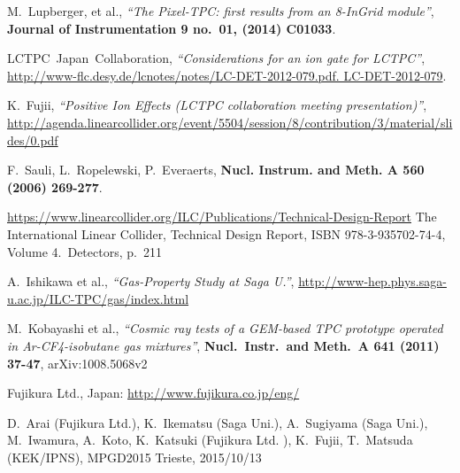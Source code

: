 \begin{thebibliography}{9}
M.~Lupberger, et al., \textit{``The Pixel-TPC: first results from an 8-InGrid module''}, {{\textbf {Journal of Instrumentation {\bfseries 9} no.~01, (2014) {C01033}}}}.








LCTPC~Japan~Collaboration, \textit{``Considerations for an ion gate for LCTPC''},
\url{http://www-flc.desy.de/lcnotes/notes/LC-DET-2012-079.pdf. LC-DET-2012-079}.



K.~Fujii, \textit{``Positive Ion Effects (LCTPC collaboration meeting presentation)''},
\url{http://agenda.linearcollider.org/event/5504/session/8/contribution/3/material/slides/0.pdf}






F.~Sauli, L.~Ropelewski, P.~Everaerts, \textbf{Nucl. Instrum. and Meth. A 560 (2006)  269-277}.



\url{https://www.linearcollider.org/ILC/Publications/Technical-Design-Report}
The International Linear Collider, Technical Design Report, ISBN 978-3-935702-74-4,
Volume 4.~Detectors, p.~211



A.~Ishikawa et al., \textit{``Gas-Property Study at Saga U.''}, \url{http://www-hep.phys.saga-u.ac.jp/ILC-TPC/gas/index.html}



M.~Kobayashi et al., \textit{``Cosmic ray tests of a GEM-based TPC prototype operated in Ar-CF4-isobutane gas mixtures''}, \textbf{Nucl.~Instr.~and Meth.~A 641 (2011) 37-47}, arXiv:1008.5068v2



Fujikura Ltd., Japan: \url{http://www.fujikura.co.jp/eng/}



D.~Arai (Fujikura Ltd.), K.~Ikematsu (Saga Uni.), A.~Sugiyama (Saga Uni.), M.~Iwamura, A.~Koto, K.~Katsuki (Fujikura Ltd. ), K.~Fujii, T.~Matsuda (KEK/IPNS), MPGD2015 Trieste, 2015/10/13








\end{thebibliography}
